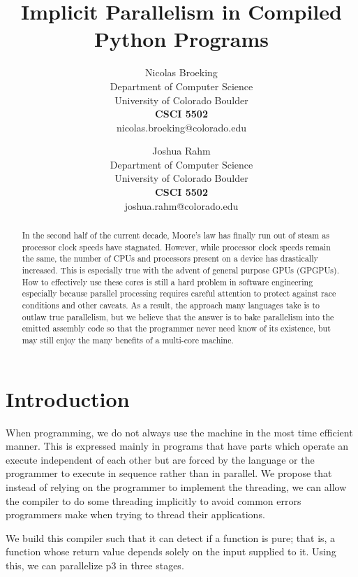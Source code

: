 \documentclass{acm_proc_article-sp}
\title{Implicit Parallelism in Compiled Python Programs}
\author{
    Nicolas Broeking \\
    \small Department of Computer Science \\
    \small University of Colorado Boulder \\
    \small \textbf{CSCI 5502} \\
    \small nicolas.broeking@colorado.edu \\
    \and
    Joshua Rahm \\
    \small Department of Computer Science \\
    \small University of Colorado Boulder \\
    \small \textbf{CSCI 5502} \\
    \small joshua.rahm@colorado.edu \\
}
\begin{document}

\maketitle

\begin{abstract}

In the second half of the current decade, Moore's law has
finally run out of steam as processor clock speeds have stagnated. However,
while processor clock speeds remain the same, the number of CPUs and processors
present on a device has drastically increased.  This is especially true with
the advent of general purpose GPUs (GPGPUs). How to effectively use these cores
is still a hard problem in software engineering especially because parallel
processing requires careful attention to protect against race conditions and
other caveats.  As a result, the approach many languages take is to outlaw true
parallelism, but we believe that the answer is to bake parallelism into the emitted
assembly code so that the programmer never need know of its existence, but may still
enjoy the many benefits of a multi-core machine.

\end{abstract}

\section*{Introduction}
When programming, we do not always use the machine in the most time efficient manner.
This is expressed mainly in programs that have parts which operate an execute independent
of each other but are forced by the language or the programmer to execute in sequence rather
than in parallel. We propose that instead of relying on the programmer to implement the threading,
we can allow the compiler to do some threading implicitly to avoid common errors programmers make
when trying to thread their applications.

We build this compiler such that it can detect if a function is pure; that is, a function
whose return value depends solely on the input supplied to it. Using this, we can parallelize
p3 in three stages.
\end{document}
